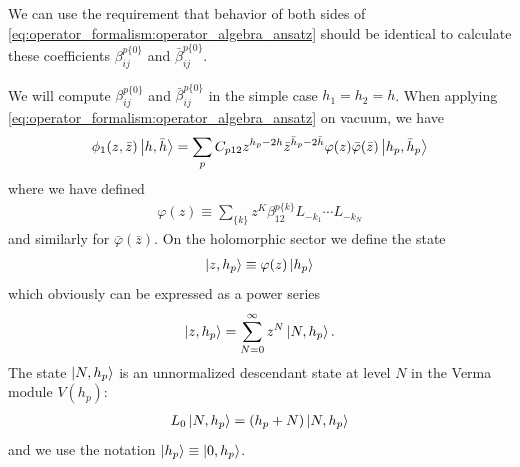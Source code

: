\documentclass[10pt]{article}
\begin{document}
\begin{intu}
    We can use the requirement that behavior of both sides of \cref{eq:operator_formalism:operator_algebra_ansatz} should be identical to calculate these coefficients $\beta^{p\{0\}}_{ij}$ and $\bar{\beta}^{p\{0\}}_{ij}$.
\end{intu}
\begin{example}
    We will compute $\beta^{p\{0\}}_{ij}$ and $\bar{\beta}^{p\{0\}}_{ij}$ in the simple case $h_1=h_2=h$.
    When applying \cref{eq:operator_formalism:operator_algebra_ansatz} on vacuum, we have 
    \begin{align}\label{eq:operator_formalism:operator_algebra:ex_1}
        \phi_1(z,\bar{z})\ket{h,\bar{h}}=\sum_p C_{p12}z^{h_p-2h}\bar{z}^{\bar{h}_p-2\bar{h}}\varphi(z)\bar{\varphi}(\bar{z})\ket{h_p,\bar{h}_p}
    \end{align}
    where we have defined 
    \begin{align}
        \varphi(z)\equiv\sum_{\{k\}}z^K \beta_{12}^{p\{k\}}L_{-k_1}\cdots L_{-k_N}
    \end{align}
    and similarly for $\bar{\varphi}(\bar{z})$.
    On the holomorphic sector we define the state 
    \begin{align}
        \ket{z,h_p}\equiv\varphi(z)\ket{h_p}\label{eq:operator_formalism:operator_algebra:ex_5}
    \end{align}
    which obviously can be expressed as a power series 
    \begin{align}
        \ket{z,h_p}=\sum_{N=0}^\infty z^N\ket{N,h_p}.\label{eq:operator_formalism:operator_algebra:ex_3}
    \end{align}
    The state $\ket{N,h_p}$ is an unnormalized descendant state at level $N$ in the Verma module $V(h_p)$:
    \begin{align}
        L_0\ket{N,h_p}=(h_p+N)\ket{N,h_p}
    \end{align}
    and we use the notation $\ket{h_p}\equiv\ket{0,h_p}$.
    

\end{example}
\end{document}
